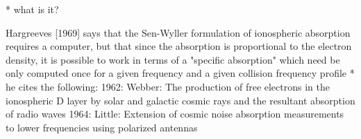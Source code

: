 
* what is it?

Hargreeves [1969] says that the Sen-Wyller formulation of ionospheric
absorption requires a computer, but that since the absorption is
proportional to the electron density, it is possible to work in terms of
a "specific absorption" which need be only computed once for a given
frequency and a given collision frequency profile
* he cites the following:
1962: Webber: The production of free electrons in the ionospheric D
layer by solar and galactic cosmic rays and the resultant absorption of
radio waves
1964: Little: Extension of cosmic noise absorption measurements to lower
frequencies using polarized antennas
